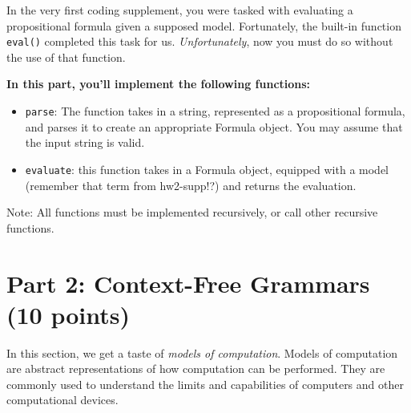 \documentclass{article}
\begin{document}
\begin{tcolorbox}[enhanced,interior style={top color=Dandelion!20,bottom color=Dandelion!30}]
    In the very first coding supplement, you were tasked with evaluating a propositional formula given a supposed model. Fortunately, the built-in function \lstinline{eval()} completed this task for us. \textit{Unfortunately}, now you must do so without the use of that function.

    
    
    \textbf{In this part, you'll implement the following functions:}
    \begin{itemize}

        

        \item \lstinline{parse}: The function takes in a string, represented as a propositional formula, and parses it to create an appropriate Formula object. You may assume that the input string is valid.
        \item \lstinline{evaluate}: this function takes in a Formula object, equipped with a model (remember that term from hw2-supp!?) and returns the evaluation. 
    \end{itemize}

    Note: All functions must be implemented recursively, or call other recursive functions.
\end{tcolorbox}

\section*{Part 2: Context-Free Grammars (10 points)}
    In this section, we get a taste of \textit{models of computation}. Models of computation are abstract representations of how computation can be performed. They are commonly used to understand the limits and capabilities of computers and other computational devices.
\end{document}
